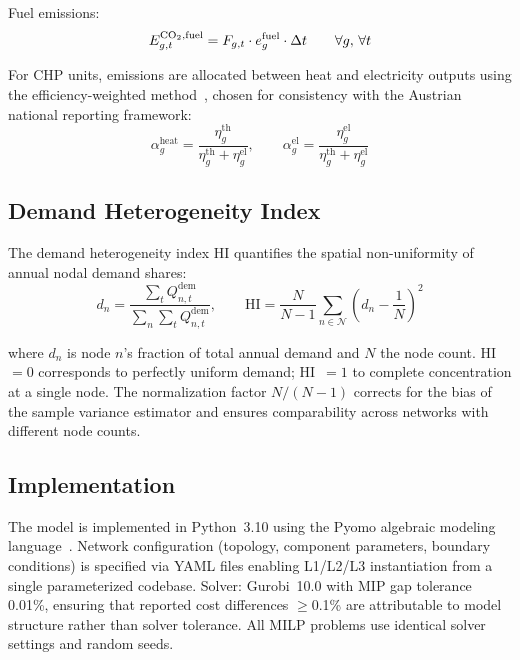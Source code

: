 \documentclass[review,3p]{elsarticle}
\begin{document}
Fuel emissions:
\begin{equation}
E_{g,t}^{\ce{CO2},\mathrm{fuel}} = F_{g,t} \cdot e_g^{\mathrm{fuel}}
\cdot \Delta t
\qquad \forall g,\, \forall t
\label{eq:em_fuel}
\end{equation}

For CHP units, emissions are allocated between heat and electricity
outputs using the efficiency-weighted method~\cite{Lund2014_4GDH},
chosen for consistency with the Austrian national reporting framework:
\begin{equation}
\alpha_g^{\mathrm{heat}} = \frac{\eta_g^{\mathrm{th}}}{
\eta_g^{\mathrm{th}} + \eta_g^{\mathrm{el}}}, \qquad
\alpha_g^{\mathrm{el}} = \frac{\eta_g^{\mathrm{el}}}{
\eta_g^{\mathrm{th}} + \eta_g^{\mathrm{el}}}
\label{eq:em_chp_alloc}
\end{equation}

\subsection{Demand Heterogeneity Index}
\label{sec:model_hi}

The demand heterogeneity index HI quantifies the spatial
non-uniformity of annual nodal demand shares:
\begin{equation}
d_n = \frac{\sum_t Q_{n,t}^{\mathrm{dem}}}{\sum_n \sum_t
Q_{n,t}^{\mathrm{dem}}}, \qquad
\mathrm{HI} = \frac{N}{N-1} \sum_{n \in \mathcal{N}}
\left(d_n - \frac{1}{N}\right)^2
\label{eq:hi}
\end{equation}

where $d_n$ is node $n$'s fraction of total annual demand and
$N$ the node count. HI~$= 0$ corresponds to perfectly uniform demand;
HI~$= 1$ to complete concentration at a single node. The
normalization factor $N/(N-1)$ corrects for the bias of the sample
variance estimator and ensures comparability across networks with
different node counts.

\subsection{Implementation}
\label{sec:model_impl}

The model is implemented in Python~3.10 using the Pyomo algebraic
modeling language~\cite{pyomo}. Network configuration (topology,
component parameters, boundary conditions) is specified via YAML
files enabling L1/L2/L3 instantiation from a single parameterized
codebase. Solver: Gurobi~10.0 with MIP gap tolerance 0.01\%, ensuring
that reported cost differences $\geq$0.1\% are attributable to model
structure rather than solver tolerance. All MILP problems use identical
solver settings and random seeds.
\end{document}

